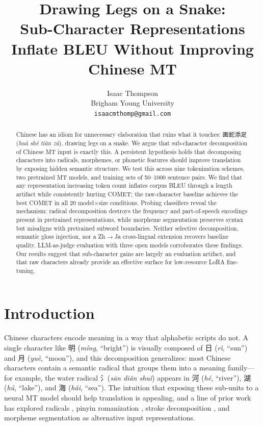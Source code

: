 \documentclass[11pt]{article}
\title{Drawing Legs on a Snake:\\
Sub-Character Representations Inflate BLEU Without Improving Chinese MT}
\author{
  Isaac Thompson \\
  Brigham Young University \\
  \texttt{isaacmthomp@gmail.com}
}
\begin{document}
\maketitle

\begin{abstract}
Chinese has an idiom for unnecessary elaboration that ruins what it touches: 画蛇添足 (\textit{huà shé tiān zú}), drawing legs on a snake. We argue that sub-character decomposition of Chinese MT input is exactly this. A persistent hypothesis holds that decomposing characters into radicals, morphemes, or phonetic features should improve translation by exposing hidden semantic structure. We test this across nine tokenization schemes, two pretrained MT models, and training sets of 50--1000 sentence pairs. We find that any representation increasing token count inflates corpus BLEU through a length artifact while consistently hurting COMET; the raw-character baseline achieves the best COMET in all 20 model$\times$size conditions. Probing classifiers reveal the mechanism: radical decomposition destroys the frequency and part-of-speech encodings present in pretrained representations, while morpheme segmentation preserves syntax but misaligns with pretrained subword boundaries. Neither selective decomposition, semantic gloss injection, nor a Zh$\to$Ja cross-lingual extension recovers baseline quality. LLM-as-judge evaluation with three open models corroborates these findings. Our results suggest that sub-character gains are largely an evaluation artifact, and that raw characters already provide an effective surface for low-resource LoRA fine-tuning.
\end{abstract}

\section{Introduction}
\label{sec:intro}

Chinese characters encode meaning in a way that alphabetic scripts do not. A single character like 明 (\textit{míng}, ``bright'') is visually composed of 日 (\textit{rì}, ``sun'') and 月 (\textit{yuè}, ``moon''), and this decomposition generalizes: most Chinese characters contain a semantic radical that groups them into a meaning family---for example, the water radical 氵(\textit{sān diǎn shuǐ}) appears in 河 (\textit{hé}, ``river''), 湖 (\textit{hú}, ``lake''), and 海 (\textit{hǎi}, ``sea''). The intuition that exposing these sub-units to a neural MT model should help translation is appealing, and a line of prior work has explored radicals \citep{shi-etal-2015-radical,zhao-etal-2019-subchar}, pinyin romanization \citep{yang-etal-2016-toward}, stroke decomposition \citep{cao-etal-2018-cw2vec}, and morpheme segmentation \citep{su-etal-2017-lattice} as alternative input representations.
\end{document}
